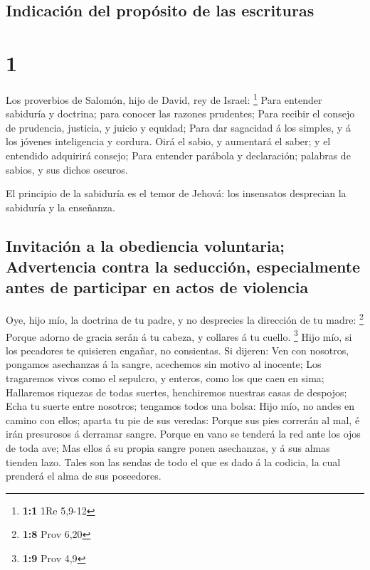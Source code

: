 \hypertarget{indicaciuxf3n-del-propuxf3sito-de-las-escrituras}{%
\subsection{Indicación del propósito de las
escrituras}\label{indicaciuxf3n-del-propuxf3sito-de-las-escrituras}}

\hypertarget{section}{%
\section{1}\label{section}}

 Los proverbios de Salomón, hijo de David, rey de Israel:
\footnote{\textbf{1:1} 1Re 5,9-12}  Para entender
sabiduría y doctrina; para conocer las razones prudentes; 
Para recibir el consejo de prudencia, justicia, y juicio y equidad;
 Para dar sagacidad á los simples, y á los jóvenes
inteligencia y cordura.  Oirá el sabio, y aumentará el
saber; y el entendido adquirirá consejo;  Para entender
parábola y declaración; palabras de sabios, y sus dichos oscuros.

 El principio de la sabiduría es el temor de Jehová: los
insensatos desprecian la sabiduría y la enseñanza.

\hypertarget{invitaciuxf3n-a-la-obediencia-voluntaria-advertencia-contra-la-seducciuxf3n-especialmente-antes-de-participar-en-actos-de-violencia}{%
\subsection{Invitación a la obediencia voluntaria; Advertencia contra la
seducción, especialmente antes de participar en actos de
violencia}\label{invitaciuxf3n-a-la-obediencia-voluntaria-advertencia-contra-la-seducciuxf3n-especialmente-antes-de-participar-en-actos-de-violencia}}

 Oye, hijo mío, la doctrina de tu padre, y no desprecies
la dirección de tu madre: \footnote{\textbf{1:8} Prov 6,20}
 Porque adorno de gracia serán á tu cabeza, y collares á
tu cuello. \footnote{\textbf{1:9} Prov 4,9}  Hijo mío, si
los pecadores te quisieren engañar, no consientas.  Si
dijeren: Ven con nosotros, pongamos asechanzas á la sangre, acechemos
sin motivo al inocente;  Los tragaremos vivos como el
sepulcro, y enteros, como los que caen en sima; 
Hallaremos riquezas de todas suertes, henchiremos nuestras casas de
despojos;  Echa tu suerte entre nosotros; tengamos todos
una bolsa:  Hijo mío, no andes en camino con ellos;
aparta tu pie de sus veredas:  Porque sus pies correrán
al mal, é irán presurosos á derramar sangre.  Porque en
vano se tenderá la red ante los ojos de toda ave;  Mas
ellos á su propia sangre ponen asechanzas, y á sus almas tienden lazo.
 Tales son las sendas de todo el que es dado á la
codicia, la cual prenderá el alma de sus poseedores.

